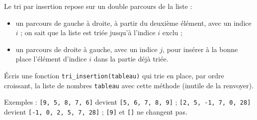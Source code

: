 Le tri par insertion repose sur un double parcours de la liste :
\begin{itemize}
\item un parcours de gauche à droite, à partir du deuxième élément, avec un indice $i$ ; on sait que la liste est triée jusqu'à l'indice $i$ exclu ;
\item un parcours de droite à gauche, avec un indice $j$, pour insérer à la bonne place l'élément d'indice $i$ dans la partie déjà triée.
\end{itemize}
Écris une fonction \texttt{tri\_insertion(tableau)} qui trie en place, par ordre croissant, la liste de nombres \texttt{tableau} avec cette méthode (inutile de la renvoyer).

Exemples : \texttt{[9, 5, 8, 7, 6]} devient \texttt{[5, 6, 7, 8, 9]} ; \texttt{[2, 5, -1, 7, 0, 28]} devient \texttt{[-1, 0, 2, 5, 7, 28]} ; \texttt{[9]} et \texttt{[]} ne changent pas.
